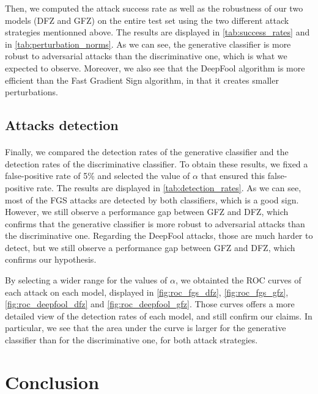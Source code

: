 \documentclass[10pt,twocolumn,letterpaper]{article}
\begin{document}
Then, we computed the attack success rate as well as the robustness of our two models (DFZ and GFZ) on the entire test set using the two different attack strategies mentionned above. The results are displayed in \cref{tab:success_rates} and in \cref{tab:perturbation_norms}. As we can see, the generative classifier is more robust to adversarial attacks than the discriminative one, which is what we expected to observe. Moreover, we also see that the DeepFool algorithm is more efficient than the Fast Gradient Sign algorithm, in that it creates smaller perturbations.

\subsection{Attacks detection}

\paragraph{} Finally, we compared the detection rates of the generative classifier and the detection rates of the discriminative classifier. To obtain these results, we fixed a false-positive rate of 5\% and selected the value of $\alpha$ that ensured this false-positive rate. The results are displayed in \cref{tab:detection_rates}. As we can see, most of the FGS attacks are detected by both classifiers, which is a good sign. However, we still observe a performance gap between GFZ and DFZ, which confirms that the generative classifier is more robust to adversarial attacks than the discriminative one. Regarding the DeepFool attacks, those are much harder to detect, but we still observe a performance gap between GFZ and DFZ, which confirms our hypothesis.

By selecting a wider range for the values of $\alpha$, we obtainted the ROC curves of each attack on each model, displayed in \cref{fig:roc_fgs_dfz}, \cref{fig:roc_fgs_gfz}, \cref{fig:roc_deepfool_dfz} and \cref{fig:roc_deepfool_gfz}. Those curves offers a more detailed view of the detection rates of each model, and still confirm our claims. In particular, we see that the area under the curve is larger for the generative classifier than for the discriminative one, for both attack strategies.


\section{Conclusion}
\label{sec:conclusion}
\end{document}
